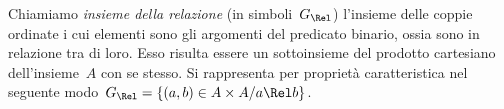 \begin{definizione}
Chiamiamo \emph{insieme della relazione} (in simboli~$G_\Rel$) l'insieme delle 
coppie ordinate i cui
elementi sono gli argomenti del predicato binario, ossia sono in relazione tra 
di loro. Esso risulta essere un
sottoinsieme del prodotto cartesiano dell'insieme~$A$ con se stesso. Si 
rappresenta per proprietà caratteristica nel
seguente modo~$G_\Rel = \lbrace (a,b) \in A \times A / a \Rel b \rbrace$.
\end{definizione}


\begin{comment}
 
\subsection{Rappresentazioni di una relazione}
\label{subsec:rel_rappresentazione}

\subsubsection{Grafico di una relazione}

Dal momento che una relazione in un insieme~$Y$ determina un sottoinsieme del 
prodotto cartesiano~$Y \times Y$ è
comodo rappresentare una relazione nello stesso diagramma usato per 
rappresentare il prodotto cartesiano.
Una relazione può quindi essere rappresentata attraverso un \emph{grafico 
cartesiano}.


\subsubsection{Matrice o tabella di una relazione}

Nella figura~\ref{fig:B.1} è rappresentata la classica griglia per il gioco 
della battaglia navale.
Ogni cella è individuata da una coppia ordinata il cui primo elemento (una 
lettera dell'alfabeto) indica la riga,
il secondo (un numero) indica la colonna; così la coppia~$(D,5)$ indica la cella 
annerita.



\subsubsection{Grafo di una relazione}


\end{comment}
